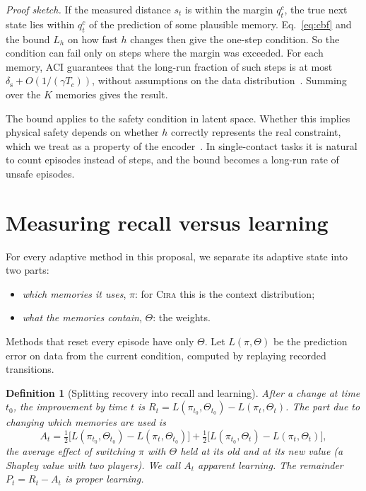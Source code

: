 \documentclass[10pt]{article}
\newtheorem{definition}{Definition}
\newcommand{\method}{\textsc{Cira}}
\begin{document}
\noindent\emph{Proof sketch.} If the measured distance $s_t$ is within the margin $q^c_t$, the true
next state lies within $q^c_t$ of the prediction of some plausible memory. Eq.~\eqref{eq:cbf} and the
bound $L_h$ on how fast $h$ changes then give the one-step condition. So the condition can fail only on
steps where the margin was exceeded. For each memory, ACI guarantees that the long-run fraction of
such steps is at most $\delta_{\mathrm{s}}+O(1/(\gamma T_c))$, without assumptions on the data
distribution~\cite{gibbs2021adaptive}. Summing over the $K$ memories gives the result.

The bound applies to the safety condition in latent space. Whether this implies physical safety
depends on whether $h$ correctly represents the real constraint, which we treat as a property of the
encoder~\cite{lutkus2025latent}. In single-contact tasks it is natural to count episodes instead of
steps, and the bound becomes a long-run rate of unsafe episodes.

\section{Measuring recall versus learning}

For every adaptive method in this proposal, we separate its adaptive state into two parts:
\begin{itemize}
  \item \emph{which memories it uses}, $\pi$: for \method{} this is the context distribution;
  \item \emph{what the memories contain}, $\Theta$: the weights.
\end{itemize}
Methods that reset every episode have only $\Theta$. Let $L(\pi,\Theta)$ be the prediction error on
data from the current condition, computed by replaying recorded transitions.

\begin{definition}[Splitting recovery into recall and learning]\label{def:decomp}
After a change at time $t_0$, the improvement by time $t$ is
$R_t=L(\pi_{t_0},\Theta_{t_0})-L(\pi_t,\Theta_t)$. The part due to changing which memories are used is
\[
  A_t=\tfrac12\big[L(\pi_{t_0},\Theta_{t_0})-L(\pi_t,\Theta_{t_0})\big]
     +\tfrac12\big[L(\pi_{t_0},\Theta_t)-L(\pi_t,\Theta_t)\big],
\]
the average effect of switching $\pi$ with $\Theta$ held at its old and at its new value (a Shapley
value with two players). We call $A_t$ \emph{apparent learning}. The remainder $P_t=R_t-A_t$ is
\emph{proper learning}.
\end{definition}
\end{document}

